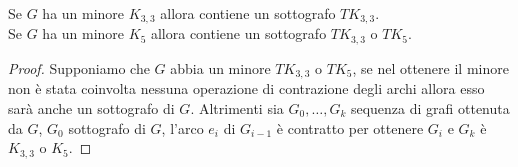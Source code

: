\begin{teorema}\label{minoreTK5}
    Se \(G\) ha un minore \(K_{3,3}\) allora contiene un sottografo \(TK_{3,3}\). \\
    Se \(G\) ha un minore \(K_5\) allora contiene un sottografo \(TK_{3,3}\) o \(TK_5\).
    \begin{proof}
        Supponiamo che \(G\) abbia un minore \(TK_{3,3}\) o \(TK_5\), se nel ottenere il minore non è stata coinvolta nessuna operazione di contrazione degli archi allora esso sarà anche un sottografo di \(G\). Altrimenti sia \(G_0,\dots, G_k\) sequenza di grafi ottenuta da \(G\), \(G_0\) sottografo di \(G\), l'arco \(e_i\) di \(G_{i-1}\) è contratto per ottenere \(G_i\) e \(G_k\) è \(K_{3,3}\) o \(K_5\).
    \end{proof}
\end{teorema}

